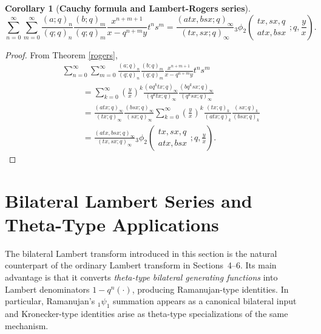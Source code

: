 \documentclass[12pt]{article}
\newtheorem{corollary}{Corollary}
\begin{document}
\begin{corollary}[\bf Cauchy formula and Lambert-Rogers series]\label{cor_CGRL}
    \begin{equation}
        \sum_{n=0}^{\infty}\sum_{m=0}^{\infty}\frac{(a;q)_n}{(q;q)_n}\frac{(b;q)_m}{(q;q)_m}\frac{x^{n+m+1}}{x-q^{n+m}y}t^ns^m=\frac{(atx,bsx;q)_\infty}{(tx,sx;q)_\infty}
    {}_{3}\phi_{2}\left(
    \begin{array}{c}
         tx,sx,q \\
         atx,bsx
    \end{array}
    ;q,\frac{y}{x}
    \right).
    \end{equation}
\end{corollary}
\begin{proof}
From Theorem \ref{rogers},
\begin{align*}
    &\sum_{n=0}^{\infty}\sum_{m=0}^{\infty}\frac{(a;q)_n}{(q;q)_n}\frac{(b;q)_m}{(q;q)_m}\frac{x^{n+m+1}}{x-q^{n+m}y}t^ns^m\\
    &\hspace{1cm}=\sum_{k=0}^{\infty}\left(\frac{y}{x}\right)^{k}\frac{(aq^ktx;q)_\infty}{(q^ktx;q)_\infty}\frac{(bq^ksx;q)_\infty}{(q^ksx;q)_\infty}\\
    &\hspace{1cm}=\frac{(atx;q)_\infty}{(tx;q)_\infty}\frac{(bsx;q)_\infty}{(sx;q)_\infty}\sum_{k=0}^{\infty}\left(\frac{y}{x}\right)^{k}\frac{(tx;q)_k}{(atx;q)_k}\frac{(sx;q)_k}{(bsx;q)_k}\\
    &\hspace{1cm}=\frac{(atx,bsx;q)_\infty}{(tx,sx;q)_\infty}
    {}_{3}\phi_{2}\left(
    \begin{array}{c}
         tx,sx,q \\
         atx,bsx
    \end{array}
    ;q,\frac{y}{x}
    \right).
\end{align*}
\end{proof}



\section{Bilateral Lambert Series and Theta-Type Applications}

The bilateral Lambert transform introduced in this section is the natural
counterpart of the ordinary Lambert transform in Sections~4--6.
Its main advantage is that it converts \emph{theta-type bilateral generating functions} into Lambert denominators \(1-q^n(\cdot)\), producing Ramanujan-type identities. In particular, Ramanujan's ${}_1\psi_1$ summation appears as a canonical bilateral
input and Kronecker-type identities arise as theta-type specializations of the same mechanism.
\end{document}
